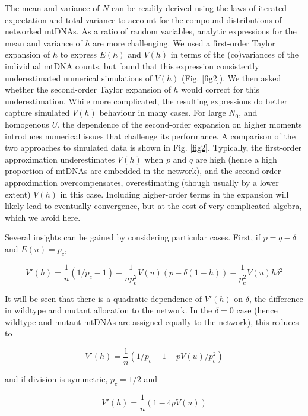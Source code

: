 \documentclass{article}
\begin{document}
The mean and variance of $N$ can be readily derived using the laws of iterated expectation and total variance to account for the compound distributions of networked mtDNAs. As a ratio of random variables, analytic expressions for the mean and variance of $h$ are more challenging. We used a first-order Taylor expansion of $h$ to express $E(h)$ and $V(h)$ in terms of the (co)variances of the individual mtDNA counts, but found that this expression consistently underestimated numerical simulations of $V(h)$ (Fig. \ref{fig2}). We then asked whether the second-order Taylor expansion of $h$ would correct for this underestimation. While more complicated, the resulting expressions do better capture simulated $V(h)$ behaviour in many cases. For large $N_0$, and homogenous $U$, the dependence of the second-order expansion on higher moments introduces numerical issues that challenge its performance. A comparison of the two approaches to simulated data is shown in Fig. \ref{fig2}. Typically, the first-order approximation underestimates $V(h)$ when $p$ and $q$ are high (hence a high proportion of mtDNAs are embedded in the network), and the second-order approximation overcompensates, overestimating (though usually by a lower extent) $V(h)$ in this case. Including higher-order terms in the expansion will likely lead to eventually convergence, but at the cost of very complicated algebra, which we avoid here.

Several insights can be gained by considering particular cases. First, if $p = q - \delta$ and $E(u) = p_c$,

\begin{equation}
  V'(h) = \frac{1}{n} (1/p_c - 1) - \frac{1}{n p_c^2} V(u) (p - \delta(1-h)) - \frac{1}{p_c^2} V(u) h \delta^2
\end{equation}

It will be seen that there is a quadratic dependence of $V'(h)$ on $\delta$, the difference in wildtype and mutant allocation to the network. In the $\delta = 0$ case (hence wildtype and mutant mtDNAs are assigned equally to the network), this reduces to

\begin{equation}
  V'(h) = \frac{1}{n} (1/p_c - 1 - p V(u)/p_c^2)
\end{equation}

and if division is symmetric, $p_c = 1/2$ and

\begin{equation}
V'(h) = \frac{1}{n} (1 - 4 p V(u))
\end{equation}
\end{document}
